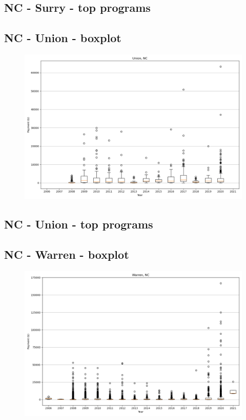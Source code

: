 \subsection*{NC - Surry - top programs}

\newpage
\subsection*{NC - Union - boxplot}
\begin{figure}[h]
\centering
\includegraphics[width=7in]{../output/boxplots/counties/Union-NC_boxplot.png}
\end{figure}


\subsection*{NC - Union - top programs}

\newpage
\subsection*{NC - Warren - boxplot}
\begin{figure}[h]
\centering
\includegraphics[width=7in]{../output/boxplots/counties/Warren-NC_boxplot.png}
\end{figure}


